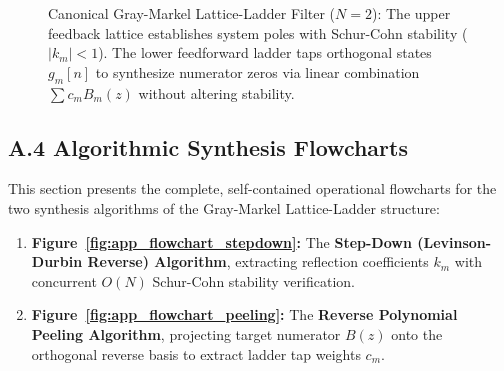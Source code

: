 \documentclass[11pt,a4paper]{article}
\begin{document}
\begin{figure}[H]
{%
}
\caption{Canonical Gray-Markel Lattice-Ladder Filter ($N = 2$): The upper feedback lattice establishes system poles with Schur-Cohn stability ($|k_m| < 1$). The lower feedforward ladder taps orthogonal states $g_m[n]$ to synthesize numerator zeros via linear combination $\sum c_m B_m(z)$ without altering stability.}
\label{fig:app_lattice_ladder}
\end{figure}

\newpage
\subsection*{A.4 Algorithmic Synthesis Flowcharts}
This section presents the complete, self-contained operational flowcharts for the two synthesis algorithms of the Gray-Markel Lattice-Ladder structure:
\begin{enumerate}
    \item \textbf{Figure~\ref{fig:app_flowchart_stepdown}:} The \textbf{Step-Down (Levinson-Durbin Reverse) Algorithm}, extracting reflection coefficients $k_m$ with concurrent $O(N)$ Schur-Cohn stability verification.
    \item \textbf{Figure~\ref{fig:app_flowchart_peeling}:} The \textbf{Reverse Polynomial Peeling Algorithm}, projecting target numerator $B(z)$ onto the orthogonal reverse basis to extract ladder tap weights $c_m$.
\end{enumerate}
\end{document}
